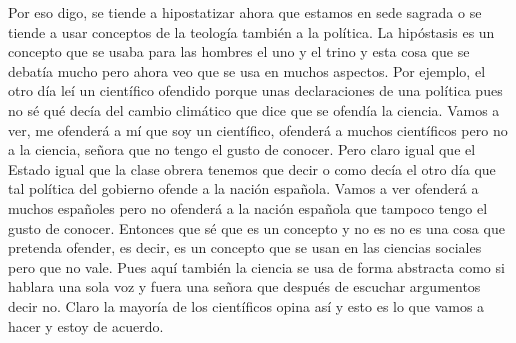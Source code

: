 Por eso digo, se tiende a hipostatizar ahora que estamos en sede sagrada o se tiende a usar conceptos de la teología también a la política. La hipóstasis es un concepto que se usaba para las hombres el uno y el trino y esta cosa que se debatía mucho pero ahora veo que se usa en muchos aspectos. Por ejemplo, el otro día leí un científico ofendido porque unas declaraciones de una política pues no sé qué decía del cambio climático que dice que se ofendía la ciencia. Vamos a ver, me ofenderá a mí que soy un científico, ofenderá a muchos científicos pero no a la ciencia, señora que no tengo el gusto de conocer. Pero claro igual que el Estado igual que la clase obrera tenemos que decir o como decía el otro día que tal política del gobierno ofende a la nación española. Vamos a ver ofenderá a muchos españoles pero no ofenderá a la nación española que tampoco tengo el gusto de conocer. Entonces que sé que es un concepto y no es no es una cosa que pretenda ofender, es decir, es un concepto que se usan en las ciencias sociales pero que no vale. Pues aquí también la ciencia se usa de forma abstracta como si hablara una sola voz y fuera una señora que después de escuchar argumentos decir no. Claro la mayoría de los científicos opina así y esto es lo que vamos a hacer y estoy de acuerdo.

